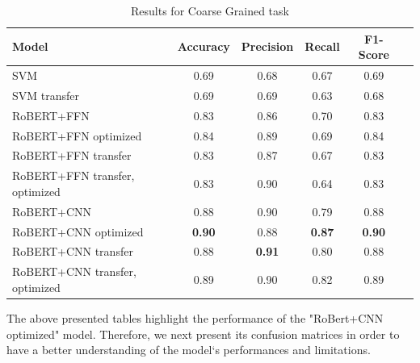 \documentclass[12pt,a4paper]{report}
\begin{document}
\begin{table}[H]\normalsize\linespread{1}
\centering
\caption{Results for Coarse Grained task}
\label{tab:resultsCG}
\begin{tabular}{ l c c c c c} 
  \hline
  \textbf{Model} &  \textbf{Accuracy} & \textbf{Precision} & \textbf{Recall} & \textbf{F1-Score}\\\hline
  SVM & 0.69 & 0.68 & 0.67 & 0.69 \\
  SVM transfer & 0.69 & 0.69 & 0.63 & 0.68\\\hline
  RoBERT+FFN & 0.83 & 0.86 & 0.70 & 0.83 \\
  RoBERT+FFN optimized & 0.84 & 0.89 & 0.69 & 0.84\\
  RoBERT+FFN transfer & 0.83 & 0.87 & 0.67 & 0.83\\
  RoBERT+FFN transfer, optimized & 0.83 & 0.90 & 0.64 & 0.83\\\hline
  RoBERT+CNN & 0.88 & 0.90 & 0.79 & 0.88 \\
  RoBERT+CNN optimized & \textbf{0.90} & 0.88 & \textbf{0.87} & \textbf{0.90} \\
  RoBERT+CNN transfer & 0.88 & \textbf{0.91} & 0.80 & 0.88 \\
  RoBERT+CNN transfer, optimized & 0.89 & 0.90 & 0.82 & 0.89 \\\hline
\end{tabular}
\end{table}

The above presented tables highlight the performance of the "RoBert+CNN optimized" model. Therefore, we next present its confusion matrices in order to have a better understanding of the model`s performances and limitations.
\end{document}
